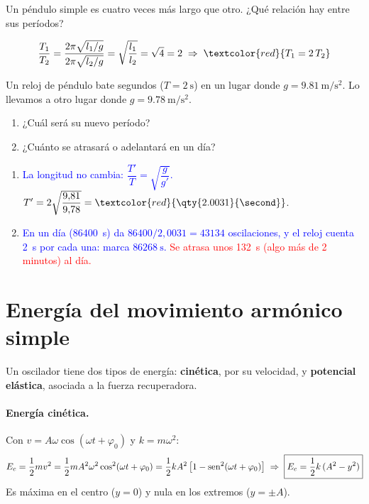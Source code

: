 \begin{exercise}
    Un péndulo simple es cuatro veces más largo que otro. ¿Qué relación hay entre sus períodos?
    \begin{solu}
        \[ \dfrac{T_1}{T_2} = \dfrac{2\pi\sqrt{l_1/g}}{2\pi\sqrt{l_2/g}} = \sqrt{\dfrac{l_1}{l_2}} = \sqrt 4 = 2 \;\Rightarrow\; \textcolor{red}{T_1 = 2\,T_2} \]
    \end{solu}
\end{exercise}

\begin{exercise}
    Un reloj de péndulo bate segundos (\(T = \qty{2}{\second}\)) en un lugar donde \(g = \qty{9.81}{\m\per\second\squared}\).
    Lo llevamos a otro lugar donde \(g = \qty{9.78}{\m\per\second\squared}\).
    \begin{enumerate}[label=\letraminuscula]
        \item ¿Cuál será su nuevo período?
        \item ¿Cuánto se atrasará o adelantará en un día?
    \end{enumerate}
    \begin{solu}
        \begin{enumerate}[label=\letraminuscula]
            \item \textcolor{blue}{La longitud no cambia: \(\dfrac{T'}{T} = \sqrt{\dfrac{g}{g'}}\).}
            \(T' = 2\sqrt{\dfrac{9{,}81}{9{,}78}} = \textcolor{red}{\qty{2.0031}{\second}}\).
            \item \textcolor{blue}{En un día (\qty{86400}{\second}) da \(86400/2{,}0031 = \num{43134}\) oscilaciones, y el reloj cuenta
            \qty{2}{\second} por cada una: marca \(\qty{86268}{\second}\).}
            \textcolor{red}{Se atrasa unos \qty{132}{\second} (algo más de 2 minutos) al día.}
        \end{enumerate}
    \end{solu}
\end{exercise}

\section{Energía del movimiento armónico simple}\label{sec:mas-energia}

Un oscilador tiene dos tipos de energía: \textbf{cinética}, por su velocidad, y \textbf{potencial elástica}, asociada a la
fuerza recuperadora.

\paragraph{Energía cinética.} Con \(v = A\omega\cos(\omega t + \varphi_0)\) y \(k = m\omega^2\):
\begin{equation*}
    E_c = \dfrac{1}{2} m v^2 = \dfrac{1}{2} m A^2\omega^2\cos^2(\omega t + \varphi_0) = \dfrac{1}{2} k A^2\left[1 - \operatorname{sen}^2(\omega t + \varphi_0)\right]
    \;\Rightarrow\; \boxed{E_c = \dfrac{1}{2} k\,(A^2 - y^2)}
\end{equation*}
Es máxima en el centro (\(y = 0\)) y nula en los extremos (\(y = \pm A\)).


